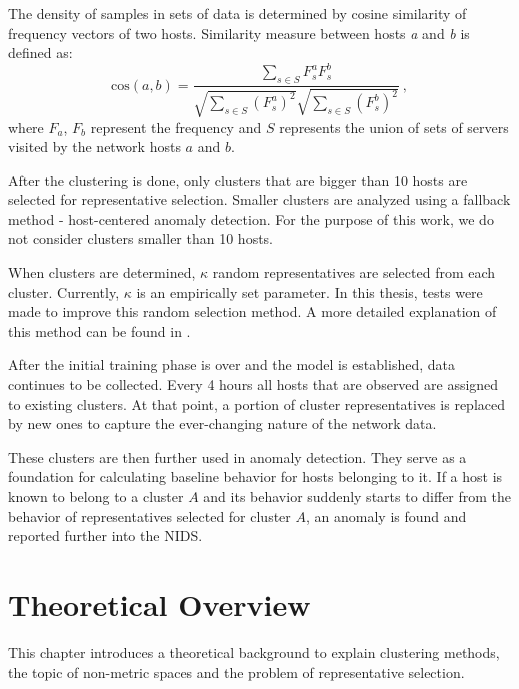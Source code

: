 \documentclass[thesis=B,english]{FITthesis}[2012/10/20]
\begin{document}
The density of samples in sets of data is determined by cosine similarity of frequency vectors of two hosts.
Similarity measure between hosts \textit{a} and \textit{b} is defined as:
\begin{equation}
\textrm{cos}(a, b) = \frac{\sum\limits_{s \in S} F_s^a F_s^b} {\sqrt{\sum\limits_{s \in S} (F_s^a)^2} \sqrt{\sum\limits_{s \in S} (F_s^b)^2}}\:,
\end{equation}
where $F_a$, $F_b$ represent the frequency and $S$ represents the union of sets of servers visited by the network hosts $a$ and $b$.

After the clustering is done, only clusters that are bigger than 10 hosts are selected for representative selection.
Smaller clusters are analyzed using a fallback method - host-centered anomaly detection.
For the purpose of this work, we do not consider clusters smaller than 10 hosts.

When clusters are determined, $\kappa$ random representatives are selected from each cluster.
Currently, $\kappa$ is an empirically set parameter.
In this thesis, tests were made to improve this random selection method.
A more detailed explanation of this method can be found in \cite{kopp2018community}.

After the initial training phase is over and the model is established, data continues to be collected.
Every 4 hours all hosts that are observed are assigned to existing clusters.
At that point, a portion of cluster representatives is replaced by new ones to capture the ever-changing nature of the network data.

These clusters are then further used in anomaly detection.
They serve as a foundation for calculating baseline behavior for hosts belonging to it.
If a host is known to belong to a cluster $A$ and its behavior suddenly starts to differ from the behavior of representatives selected for cluster $A$, an anomaly is found and reported further into the NIDS.


\chapter{Theoretical Overview}\label{ch:theory}

This chapter introduces a theoretical background to explain clustering methods, the topic of non-metric spaces and the problem of representative selection.
\end{document}
